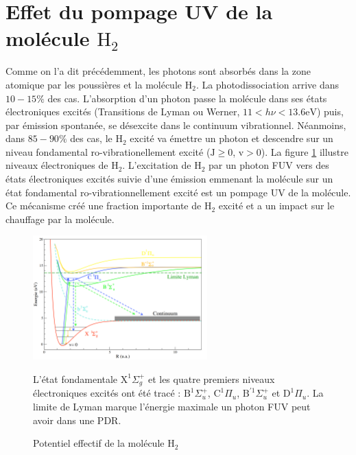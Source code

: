 \section{Effet du pompage UV de la molécule $\mathrm{H}_2$}

Comme on l'a dit précédemment, les photons sont absorbés dans la zone atomique par les poussières et la molécule $\mathrm{H}_2$. La photodissociation arrive dans $10-15\%$ des cas. L'absorption d'un photon passe la molécule dans ses états électroniques excités (Transitions de Lyman ou Werner, $ 11<h\nu<13.6\mathrm{eV}$) puis, par émission spontanée, se désexcite dans le continuum vibrationnel. Néanmoins, dans $85-90\%$ des cas, le $\mathrm{H}_2$ excité va émettre un photon et descendre sur un niveau fondamental ro-vibrationellement excité ($\mathrm{J}\geq0$, $\mathrm{v}>0$). La figure \ref{fig:H2pump} illustre niveaux électroniques de $\mathrm{H}_2$. L'excitation de $\mathrm{H}_2$ par un photon FUV vers des états électroniques excités suivie d'une émission emmenant la molécule sur un état fondamental ro-vibrationnellement excité est un pompage UV de la molécule. Ce mécanisme créé une fraction importante de $\mathrm{H}_2$ excité et a un impact sur le chauffage par la molécule. \newline 


\begin{figure}[!h]
    \centering \includegraphics[trim = {0 0 0 0},clip,width=0.6\textwidth]{figure/H2.pdf}
    \caption{Potentiel effectif de la molécule $\mathrm{H}_2$}
    \begin{minipage}{\textwidth}
    L'état fondamentale $\mathrm{X}^1\Sigma^+_g$ et les quatre premiers niveaux électroniques excités ont été tracé : $\mathrm{B}^1\Sigma_u^+$, $\mathrm{C}^1\Pi_u$, $\mathrm{B}^{'1}\Sigma_u^+$ et $\mathrm{D}^1\Pi_u$. La limite de Lyman marque l'énergie maximale un photon FUV peut avoir dans une PDR.
    \end{minipage}
    \label{fig:H2pump}
\end{figure}

